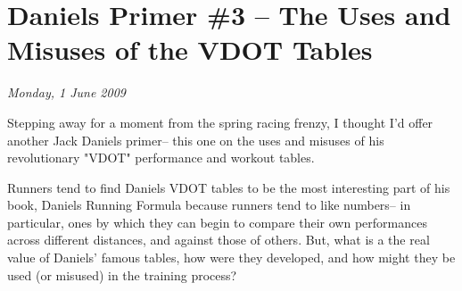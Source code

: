 \chapter{Daniels Primer \#3 -- The Uses and Misuses of the VDOT Tables}
\textit{Monday, 1 June 2009}
\bigskip

Stepping away for a moment from the spring racing frenzy, I thought I'd offer another Jack Daniels primer-- this one on the uses and misuses of his revolutionary "VDOT" performance and workout tables.

Runners tend to find Daniels VDOT tables to be the most interesting part of his book, Daniels Running Formula because runners tend to like numbers-- in particular, ones by which they can begin to compare their own performances across different distances, and against those of others. But, what is a the real value of Daniels' famous tables, how were they developed, and how might they be used (or misused) in the training process?


